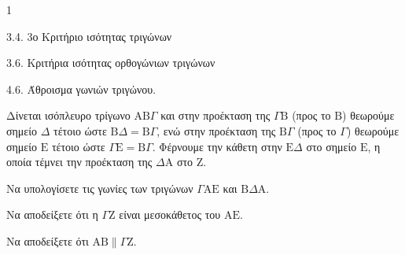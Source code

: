 \begin{ylh}{1}
    \item 3.4. 3ο Κριτήριο ισότητας τριγώνων
    \item 3.6. Κριτήρια ισότητας ορθογώνιων τριγώνων
    \item 4.6. Άθροισμα γωνιών τριγώνου.
\end{ylh}
Δίνεται ισόπλευρο τρίγωνο $\mathrm{A}\mathrm{B}\Gamma$ και στην προέκταση της $\Gamma\mathrm{B}$ (προς το $\mathrm{B}$) θεωρούμε σημείο $\Delta$ τέτοιο ώστε $\mathrm{B}\Delta = \mathrm{B}\Gamma$, ενώ στην προέκταση της $\mathrm{B}\Gamma$ (προς το $\Gamma$) θεωρούμε σημείο $\mathrm{E}$ τέτοιο ώστε $\Gamma\mathrm{E} = \mathrm{B}\Gamma$. Φέρνουμε την κάθετη στην $\mathrm{E}\Delta$ στο σημείο $\mathrm{E}$, η οποία τέμνει την προέκταση της $\Delta\mathrm{A}$ στο $\mathrm{Z}$.
\begin{alist}
    \item Να υπολογίσετε τις γωνίες των τριγώνων $\Gamma\mathrm{A}\mathrm{E}$ και $\mathrm{B}\Delta\mathrm{A}$. 
    \item Να αποδείξετε ότι η $\Gamma\mathrm{Z}$ είναι μεσοκάθετος του $\mathrm{A}\mathrm{E}$. 
    \item Να αποδείξετε ότι $\mathrm{A}\mathrm{B} \parallel \Gamma\mathrm{Z}$. 
\end{alist}
